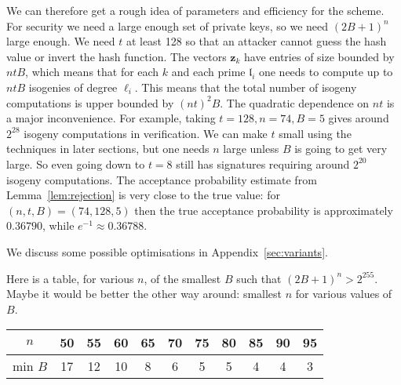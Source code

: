 \documentclass{llncs}
\renewcommand{\a}{\mathfrak{a}}
\renewcommand{\b}{\mathfrak{b}}
\renewcommand{\l}{\mathfrak{l}}
\newcommand{\f}{\textbf{f}}
\newcommand{\z}{\textbf{z}}
\begin{document}
We can therefore get a rough idea of parameters and efficiency for the scheme.
For security we need a large enough set of private keys, so we need $(2B+1)^n$ large enough.
We need $t$ at least 128 so that an attacker cannot guess the hash value or invert the hash function.
The vectors $\z_k$ have entries of size bounded by $ntB$, which means that for each $k$ and each prime $\l_i$ one needs to compute up to $ntB$ isogenies of degree $\ell_i$.
This means that the total number of isogeny computations is upper bounded by $(nt)^2 B$.
The quadratic dependence on $nt$ is a major inconvenience.
For example, taking $t=128, n = 74, B = 5$ gives around $2^{28}$ isogeny computations in verification.
We can make $t$ small using the techniques in later sections, but one needs $n$ large unless $B$ is going to get very large. So even going down to $t=8$ still has signatures requiring around $2^{20}$ isogeny computations.
The acceptance probability estimate from Lemma~\ref{lem:rejection} is very close to the true value: for $(n,t,B)=(74,128,5)$ then the true acceptance probability is approximately $0.36790$, while $e^{-1} \approx 0.36788$.

We discuss some possible optimisations in Appendix~\ref{sec:variants}.


Here is a table, for various $n$, of the smallest $B$ such that $(2B+1)^n > 2^{255}$.
Maybe it would be better the other way around: smallest $n$ for various values of $B$.

\begin{center}
\begin{tabular}{c||c|c|c|c|c|c|c|c|c|c}
 $n$     & 50 & 55 & 60 & 65 & 70 & 75 & 80 & 85 & 90 & 95 \\
\hline
 min $B$ & 17 & 12 & 10 &  8 &  6 &  5 &  5 &  4 &  4 &  3 \\
\end{tabular}
\end{center}




%
%
\end{document}
